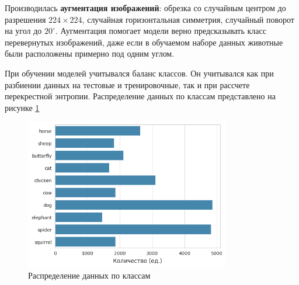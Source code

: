 Производилась \textbf{аугментация изображений}: обрезка со случайным центром до разрешения $224 \times 224$, случайная горизонтальная симметрия, случайный поворот на угол до $20^\circ$.
Аугментация помогает модели верно предсказывать класс перевернутых изображений, даже если в обучаемом наборе данных животные были расположены примерно под одним углом.

При обучении моделей учитывался баланс классов.
Он учитывался как при разбиении данных на тестовые и тренировочные, так и при рассчете перекрестной энтропии.
Распределение данных по классам представлено на рисунке \ref{fig:class_dist}
\begin{figure}[h]
    \centering
    \includegraphics[width=0.8\textwidth]{images/class_dist.png}
    \caption{Распределение данных по классам}
    \label{fig:class_dist}
\end{figure}

